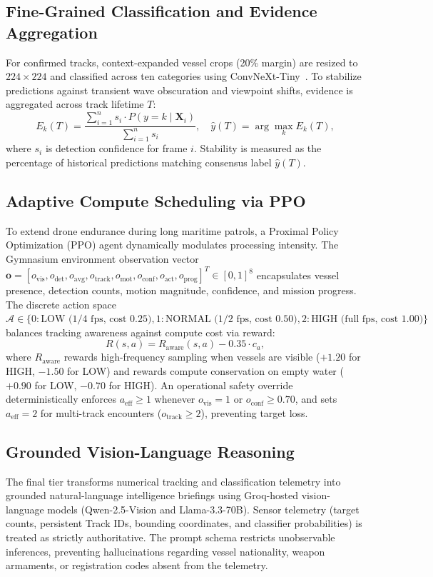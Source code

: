 \documentclass[conference]{IEEEtran}
\begin{document}
\subsection{Fine-Grained Classification and Evidence Aggregation}
For confirmed tracks, context-expanded vessel crops (20\% margin) are resized to $224\times224$ and classified across ten categories using ConvNeXt-Tiny~\cite{liu2022convnet}. To stabilize predictions against transient wave obscuration and viewpoint shifts, evidence is aggregated across track lifetime $T$:
\begin{equation}
E_k(T) = \frac{\sum_{i=1}^{n} s_i \cdot P(y = k \mid \mathbf{X}_i)}{\sum_{i=1}^{n} s_i}, \quad \hat{y}(T) = \arg\max_k E_k(T),
\label{eq:evidence}
\end{equation}
where $s_i$ is detection confidence for frame $i$. Stability is measured as the percentage of historical predictions matching consensus label $\hat{y}(T)$.

\subsection{Adaptive Compute Scheduling via PPO}
To extend drone endurance during long maritime patrols, a Proximal Policy Optimization (PPO) agent dynamically modulates processing intensity. The Gymnasium environment observation vector $\mathbf{o} = [o_{\text{vis}}, o_{\text{det}}, o_{\text{avg}}, o_{\text{track}}, o_{\text{mot}}, o_{\text{conf}}, o_{\text{act}}, o_{\text{prog}}]^T \in [0, 1]^8$ encapsulates vessel presence, detection counts, motion magnitude, confidence, and mission progress. The discrete action space $\mathcal{A} \in \{0: \text{LOW (1/4 fps, cost 0.25)}, 1: \text{NORMAL (1/2 fps, cost 0.50)}, 2: \text{HIGH (full fps, cost 1.00)}\}$ balances tracking awareness against compute cost via reward:
\begin{equation}
R(s, a) = R_{\text{aware}}(s, a) - 0.35 \cdot c_a,
\end{equation}
where $R_{\text{aware}}$ rewards high-frequency sampling when vessels are visible ($+1.20$ for HIGH, $-1.50$ for LOW) and rewards compute conservation on empty water ($+0.90$ for LOW, $-0.70$ for HIGH). An operational safety override deterministically enforces $a_{\text{eff}} \ge 1$ whenever $o_{\text{vis}} = 1$ or $o_{\text{conf}} \ge 0.70$, and sets $a_{\text{eff}} = 2$ for multi-track encounters ($o_{\text{track}} \ge 2$), preventing target loss.

\subsection{Grounded Vision-Language Reasoning}
The final tier transforms numerical tracking and classification telemetry into grounded natural-language intelligence briefings using Groq-hosted vision-language models (Qwen-2.5-Vision and Llama-3.3-70B). Sensor telemetry (target counts, persistent Track IDs, bounding coordinates, and classifier probabilities) is treated as strictly authoritative. The prompt schema restricts unobservable inferences, preventing hallucinations regarding vessel nationality, weapon armaments, or registration codes absent from the telemetry.
\end{document}
